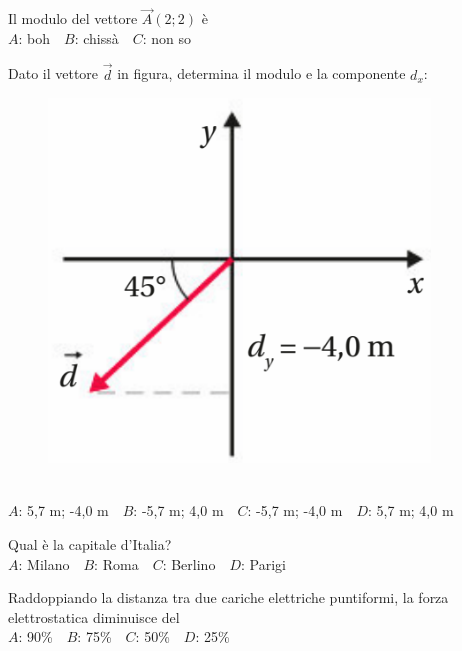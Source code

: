 \mcquestionfooter



\def\mcquestionnumber{7}


\mcquestionheader Il modulo del vettore $\vec{A}(2;2)$ è\\
{$A$}: boh\ \ {$B$}: chissà\ \ {$C$}: non so\ \ 

\mcquestionfooter



\def\mcquestionnumber{8}


\mcquestionheader Dato il vettore $\vec{d}$ in figura, determina il modulo e la componente $d_x$: \begin{figure}[h!]   \begin{center}     \includegraphics[scale=0.35]{vettored.png}   \end{center} \end{figure}\\
{$A$}: 5,7 m; -4,0 m\ \ {$B$}: -5,7 m; 4,0 m\ \ {$C$}: -5,7 m; -4,0 m\ \ {$D$}: 5,7 m; 4,0 m\ \ 

\mcquestionfooter



\def\mcquestionnumber{9}


\mcquestionheader Qual è la capitale d’Italia?\\
{$A$}: Milano\ \ {$B$}: Roma\ \ {$C$}: Berlino\ \ {$D$}: Parigi\ \ 

\mcquestionfooter



\def\mcquestionnumber{10}


\mcquestionheader Raddoppiando la distanza tra due cariche elettriche puntiformi, la forza elettrostatica diminuisce del\\
{$A$}: 90\%\ \ {$B$}: 75\%\ \ {$C$}: 50\%\ \ {$D$}: 25\%\ \ 

